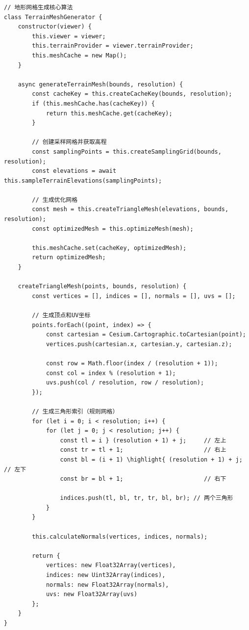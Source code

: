\begin{lstlisting}[style=javascript]
// 地形网格生成核心算法
class TerrainMeshGenerator {
    constructor(viewer) {
        this.viewer = viewer;
        this.terrainProvider = viewer.terrainProvider;
        this.meshCache = new Map();
    }
    
    async generateTerrainMesh(bounds, resolution) {
        const cacheKey = this.createCacheKey(bounds, resolution);
        if (this.meshCache.has(cacheKey)) {
            return this.meshCache.get(cacheKey);
        }
        
        // 创建采样网格并获取高程
        const samplingPoints = this.createSamplingGrid(bounds, resolution);
        const elevations = await this.sampleTerrainElevations(samplingPoints);
        
        // 生成优化网格
        const mesh = this.createTriangleMesh(elevations, bounds, resolution);
        const optimizedMesh = this.optimizeMesh(mesh);
        
        this.meshCache.set(cacheKey, optimizedMesh);
        return optimizedMesh;
    }
    
    createTriangleMesh(points, bounds, resolution) {
        const vertices = [], indices = [], normals = [], uvs = [];
        
        // 生成顶点和UV坐标
        points.forEach((point, index) => {
            const cartesian = Cesium.Cartographic.toCartesian(point);
            vertices.push(cartesian.x, cartesian.y, cartesian.z);
            
            const row = Math.floor(index / (resolution + 1));
            const col = index % (resolution + 1);
            uvs.push(col / resolution, row / resolution);
        });
        
        // 生成三角形索引（规则网格）
        for (let i = 0; i < resolution; i++) {
            for (let j = 0; j < resolution; j++) {
                const tl = i } (resolution + 1) + j;     // 左上
                const tr = tl + 1;                       // 右上  
                const bl = (i + 1) \highlight{ (resolution + 1) + j; // 左下
                const br = bl + 1;                       // 右下
                
                indices.push(tl, bl, tr, tr, bl, br); // 两个三角形
            }
        }
        
        this.calculateNormals(vertices, indices, normals);
        
        return {
            vertices: new Float32Array(vertices),
            indices: new Uint32Array(indices),
            normals: new Float32Array(normals),
            uvs: new Float32Array(uvs)
        };
    }
}
\end{lstlisting}


